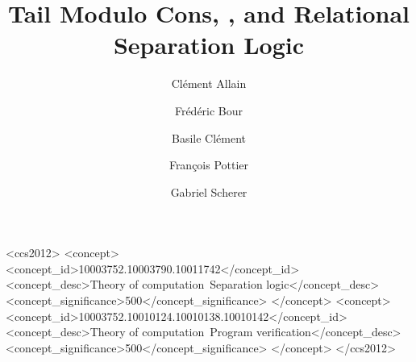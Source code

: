 \documentclass[acmsmall,screen,review]{acmart}
\begin{document}

\title{Tail Modulo Cons, \OCaml, and Relational Separation Logic}

\author{Clément Allain}

\author{Frédéric Bour}

\author{Basile Clément}

\author{François Pottier}

\author{Gabriel Scherer}

\begin{abstract}
    
\end{abstract}

\maketitle


\begin{CCSXML}
<ccs2012>
<concept>
<concept_id>10003752.10003790.10011742</concept_id>
<concept_desc>Theory of computation~Separation logic</concept_desc>
<concept_significance>500</concept_significance>
</concept>
<concept>
<concept_id>10003752.10010124.10010138.10010142</concept_id>
<concept_desc>Theory of computation~Program verification</concept_desc>
<concept_significance>500</concept_significance>
</concept>
</ccs2012>
\end{CCSXML}



\newcommand{\separate}{\FALSE}



\separate{\clearpage}{}


\separate{\clearpage}{}


\separate{\clearpage}{}

\end{document}
